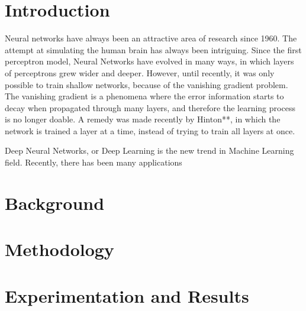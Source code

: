 \documentclass[a4paper,12pt]{report}
\begin{document}
\chapter{Introduction}

Neural networks have always been an attractive area of research since 1960. The attempt at simulating the human brain has always been intriguing. Since the first perceptron model, Neural Networks have evolved in many ways, in which layers of perceptrons grew wider and deeper. However, until recently, it was only possible to train shallow networks, because of the vanishing gradient problem. The vanishing gradient is a phenomena where the error information starts to decay when propagated through many layers, and therefore the learning process is no longer doable. A remedy was made recently by Hinton**, in which the network is trained a layer at a time, instead of trying to train all layers at once.

Deep Neural Networks, or Deep Learning is the new trend in Machine Learning field. Recently, there has been many applications 

\chapter{Background}

\chapter{Methodology}

\chapter{Experimentation and Results}
\end{document}
